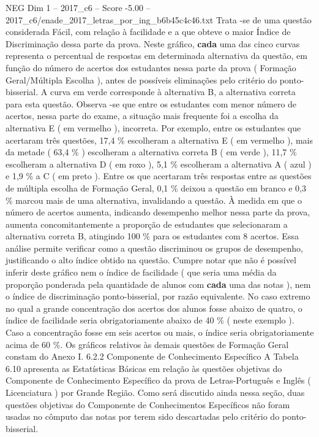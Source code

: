 \begin{textsample}{NEG Dim 1 – 2017\_c6 – Score -5.00 – 2017\_c6/enade\_2017\_letras\_por\_ing\_b6b45c4c46.txt}
Trata -se de uma questão considerada Fácil, com relação à facilidade e a que obteve o maior Índice de Discriminação dessa parte da prova.
Neste gráfico, \textbf{cada} uma das cinco curvas representa o percentual de respostas em determinada alternativa da questão, em função do número de acertos dos estudantes nessa parte da prova ( Formação Geral/Múltipla Escolha ), antes de possíveis eliminações pelo critério do ponto-bisserial.
A curva em verde corresponde à alternativa B, a alternativa correta para esta questão.
Observa -se que entre os estudantes com menor número de acertos, nessa parte do exame, a situação mais frequente foi a escolha da alternativa E ( em vermelho ), incorreta.
Por exemplo, entre os estudantes que acertaram três questões, 17,4 \% escolheram a alternativa E ( em vermelho ), mais da metade ( 63,4 \% ) escolheram a alternativa correta B ( em verde ), 11,7 \% escolheram a alternativa D ( em roxo ), 5,1 \% escolheram a alternativa A ( azul ) e 1,9 \% a C ( em preto ).
Entre os que acertaram três respostas entre as questões de múltipla escolha de Formação Geral, 0,1 \% deixou a questão em branco e 0,3 \% marcou mais de uma alternativa, invalidando a questão.
À medida em que o número de acertos aumenta, indicando desempenho melhor nessa parte da prova, aumenta concomitantemente a proporção de estudantes que selecionaram a alternativa correta B, atingindo 100 \% para os estudantes com 8 acertos.
Essa análise permite verificar como a questão discriminou os grupos de desempenho, justificando o alto índice obtido na questão.
Cumpre notar que não é possível inferir deste gráfico nem o índice de facilidade ( que seria uma média da proporção ponderada pela quantidade de alunos com \textbf{cada} uma das notas ), nem o índice de discriminação ponto-bisserial, por razão equivalente.
No caso extremo no qual a grande concentração dos acertos dos alunos fosse abaixo de quatro, o índice de facilidade seria obrigatoriamente abaixo de 40 \% ( neste exemplo ).
Caso a concentração fosse em seis acertos ou mais, o índice seria obrigatoriamente acima de 60 \%.
Os gráficos relativos às demais questões de Formação Geral constam do Anexo I. 6.2.2 Componente de Conhecimento Específico A Tabela 6.10 apresenta as Estatísticas Básicas em relação às questões objetivas do Componente de Conhecimento Específico da prova de Letras-Português e Inglês ( Licenciatura ) por Grande Região.
Como será discutido ainda nessa seção, duas questões objetivas do Componente de Conhecimentos Específicos não foram usadas no cômputo das notas por terem sido descartadas pelo critério do ponto-bisserial.

\end{textsample}
